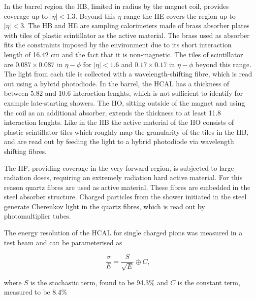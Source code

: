 In the barrel region the \ac{HB}, limited in radius by the magnet coil, provides
coverage up to $|\eta|<1.3$. Beyond this $\eta$ range the \ac{HE} covers
the region up to $|\eta|<3$. The \ac{HB} and \ac{HE} are sampling calorimeters made of brass absorber
plates with tiles of plastic scintillator as the active material. The brass used as 
absorber fits the constraints imposed by the environment due to its short interaction length
of 16.42 cm and the fact that it is non-magnetic. The tiles of scintillator 
are $0.087 \times 0.087$ in $\eta-\phi$ for $|\eta|<1.6$ and $0.17\times0.17$ in $\eta-\phi$
beyond this range. 
The light from each tile is collected with a wavelength-shifting fibre, 
which is read out using a hybrid photodiode. In the barrel, the \ac{HCAL}
has a thickness of between 5.82 and 10.6 interaction lenghts, which is not 
sufficient to identify for example late-starting showers. The \ac{HO}, sitting
outside of the magnet and using the coil as an additional absorber, extends the 
thickness to at least 11.8 interaction lenghts. 
Like in the \ac{HB} the active material of the \ac{HO} consists of plastic scintillator tiles which roughly
map the granularity of the tiles in the \ac{HB}, and are read out by feeding the light
to a hybrid photodiode via wavelength shifting fibres.

The \ac{HF}, providing coverage in the very forward region, is 
subjected to large radiation doses, requiring an extremely
radiation hard active material. For this reason quartz
fibres are used as active material. These fibres are embedded
in the steel absorber structure. Charged particles from the
shower initiated in the steel generate Cherenkov light in 
the quartz fibres, which is read out by photomultiplier tubes.

The energy resolution of the \ac{HCAL} for single charged pions 
was measured in a test beam \cite{cms-hcalecal}
and can be parameterised as 

\begin{equation}\label{eqn:hcal_res}
\frac{\sigma}{E} = \frac{S}{\sqrt{E}} \oplus C,
\end{equation}

where $S$ is the stochastic term, found to be 94.3\% %
and $C$ is the constant term, measured to be 8.4\% %

